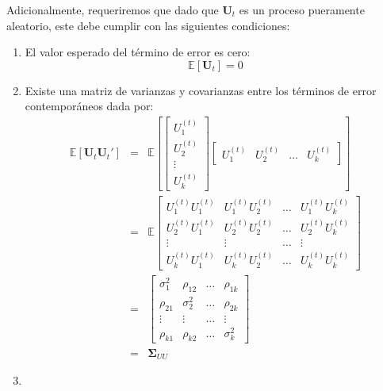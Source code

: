 \documentclass[
]{book}
\begin{document}
Adicionalmente, requeriremos que dado que \(\mathbf{U}_t\) es un proceso pueramente aleatorio, este debe cumplir con las siguientes condiciones:

\begin{enumerate}
\def\labelenumi{\arabic{enumi}.}
\item
  El valor esperado del término de error es cero:
  \begin{equation}
     \mathbb{E}[\mathbf{U}_t] = 0
    \end{equation}
\item
  Existe una matriz de varianzas y covarianzas entre los términos de error contemporáneos dada por:
  \begin{eqnarray}
     \mathbb{E}[\mathbf{U}_t \mathbf{U}_t'] 
     & = &
     \mathbb{E} \left[
     \begin{bmatrix}
     U^{(t)}_{1} \\ U^{(t)}_{2} \\ \vdots \\ U^{(t)}_{k}
     \end{bmatrix}
     \begin{bmatrix}
     U^{(t)}_{1} & U^{(t)}_{2} & \ldots & U^{(t)}_{k}
     \end{bmatrix}
     \right] \nonumber \\
     & = & \mathbb{E}
     \begin{bmatrix}
     U^{(t)}_{1} U^{(t)}_{1} & U^{(t)}_{1} U^{(t)}_{2} & \ldots & U^{(t)}_{1} U^{(t)}_{k} \\
     U^{(t)}_{2} U^{(t)}_{1} & U^{(t)}_{2} U^{(t)}_{2} & \ldots & U^{(t)}_{2} U^{(t)}_{k} \\
     \vdots & \vdots & \ldots & \vdots \\
     U^{(t)}_{k} U^{(t)}_{1} & U^{(t)}_{k} U^{(t)}_{2} & \ldots & U^{(t)}_{k} U^{(t)}_{k}
     \end{bmatrix} \nonumber \\
     & = & \begin{bmatrix}
     \sigma^2_1 & \rho_{12} & \ldots & \rho_{1k} \\
     \rho_{21} & \sigma^2_2 & \ldots & \rho_{2k} \\
     \vdots & \vdots & \ldots & \vdots \\
     \rho_{k1} & \rho_{k2} & \ldots & \sigma^2_k
     \end{bmatrix} \nonumber \\
     & = & \mathbf{\Sigma}_{UU}
     \label{eq:SigmaVAR}
    \end{eqnarray}
\item

\end{enumerate}
\end{document}
